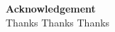 \Huge\textbf{Acknowledgement}\\
\vspace{1cm}
\normalsize
Thanks Thanks Thanks\\

\cleardoubleemptypage
